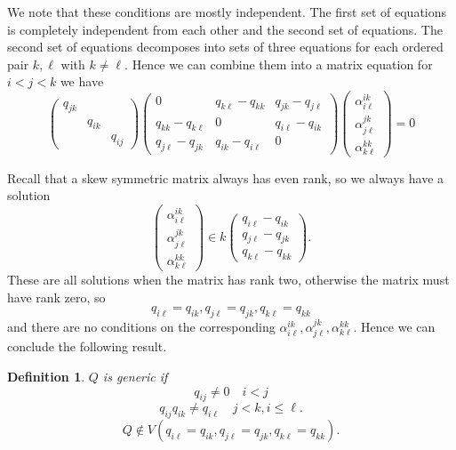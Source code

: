 \documentclass[12]{article}
\newtheorem{definition}{Definition}
\begin{document}
We note that these conditions are mostly independent.  The first set of equations is completely independent from each other and the second set of equations.
The second set of equations decomposes into sets of three equations
for each ordered pair $k,\ell$ with $k \neq \ell.$
Hence we can combine them into a matrix equation for $i<j<k$ we have
$$\begin{pmatrix}
  q_{jk} & & \\
    & q_{ik} & \\
    & & q_{ij}
\end{pmatrix}
\begin{pmatrix}
  0 & q_{k \ell}-q_{kk} & q_{jk} - q_{j\ell} \\
  q_{kk} - q_{k \ell} & 0 & q_{i\ell} - q_{ik} \\
  q_{j\ell} - q_{jk} & q_{ik} - q_{i\ell} & 0
\end{pmatrix}
\begin{pmatrix}
  \alpha^{ik}_{i\ell} \\ \alpha^{jk}_{j\ell} \\  \alpha^{kk}_{k\ell}
  \end{pmatrix} = 0
$$

Recall that a skew symmetric matrix always has even rank, so we always have a solution
$$\begin{pmatrix}
  \alpha^{ik}_{i\ell} \\ \alpha^{jk}_{j\ell} \\  \alpha^{kk}_{k\ell}
\end{pmatrix}
\in k
\begin{pmatrix}
  q_{i\ell} - q_{ik} \\ q_{j\ell} - q_{jk} \\ q_{k\ell} - q_{kk}
\end{pmatrix}.$$
These are all solutions when the matrix has rank two, otherwise the matrix must have rank zero, so $$ q_{i\ell} = q_{ik},q_{j\ell} = q_{jk}, q_{k\ell} = q_{kk}$$
and there are no conditions on the corresponding  $\alpha^{ik}_{i\ell},\alpha^{jk}_{j\ell},\alpha^{kk}_{k\ell}.$  Hence we can conclude the following result.

\begin{definition}
  $Q$ is {\it generic} if 
  $$q_{ij} \neq 0 \quad i<j$$
  $$q_{ij}q_{ik} \neq q_{i\ell} \quad j<k, i \leq \ell.$$
  $$ Q \notin V(q_{i\ell} = q_{ik},q_{j\ell} = q_{jk}, q_{k\ell} = q_{kk}).$$
\end{definition}
\end{document}
